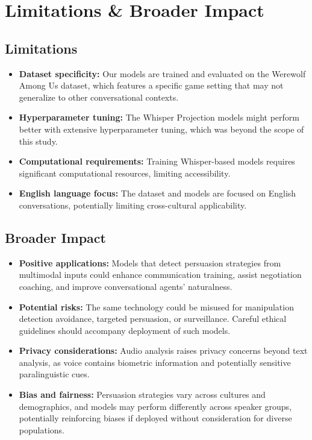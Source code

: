 \documentclass{article}
\begin{document}
\section{Limitations \& Broader Impact}
\subsection{Limitations}
\begin{itemize}
    \item \textbf{Dataset specificity:} Our models are trained and evaluated on the Werewolf Among Us dataset, which features a specific game setting that may not generalize to other conversational contexts.
    
    \item \textbf{Hyperparameter tuning:} The Whisper Projection models might perform better with extensive hyperparameter tuning, which was beyond the scope of this study.
    
    \item \textbf{Computational requirements:} Training Whisper-based models requires significant computational resources, limiting accessibility.
    
    \item \textbf{English language focus:} The dataset and models are focused on English conversations, potentially limiting cross-cultural applicability.
\end{itemize}

\subsection{Broader Impact}
\begin{itemize}
    \item \textbf{Positive applications:} Models that detect persuasion strategies from multimodal inputs could enhance communication training, assist negotiation coaching, and improve conversational agents' naturalness.
    
    \item \textbf{Potential risks:} The same technology could be misused for manipulation detection avoidance, targeted persuasion, or surveillance. Careful ethical guidelines should accompany deployment of such models.
    
    \item \textbf{Privacy considerations:} Audio analysis raises privacy concerns beyond text analysis, as voice contains biometric information and potentially sensitive paralinguistic cues.
    
    \item \textbf{Bias and fairness:} Persuasion strategies vary across cultures and demographics, and models may perform differently across speaker groups, potentially reinforcing biases if deployed without consideration for diverse populations.
\end{itemize}
\end{document}
